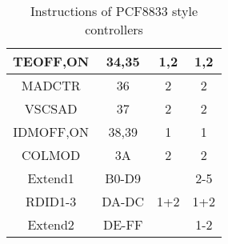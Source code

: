 \documentclass[pdftex,12pt,a4paper,oneside,english]{report}
\begin{document}
\begin{table}[H]
\begin{center}
\begin{tabular}{| c | c || c | c |}
    \hline
    TEOFF,ON    & 34,35 &     1,2    &     1,2     \\
    \hline
    MADCTR      & 36    &     2      &     2       \\
    \hline
    VSCSAD      & 37    &     2      &     2       \\
    \hline
    IDMOFF,ON   & 38,39 &     1      &     1       \\
    \hline
    COLMOD      & 3A    &     2      &     2       \\
    \hline
    Extend1     & B0-D9 &            &     2-5     \\
    \hline
    RDID1-3     & DA-DC &     1+2    &     1+2     \\
    \hline
    Extend2     & DE-FF &            &     1-2     \\
    \hline
    \end{tabular}
  \end{center}
  \caption{Instructions of PCF8833 style controllers}
  \label{tab:pcf8830}
\end{table}
\end{document}
